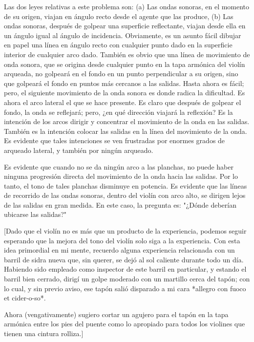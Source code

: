 \documentclass[12pt]{book}
\begin{document}
Las dos leyes relativas a este problema son: (a) Las ondas sonoras, en el momento de su origen, viajan en ángulo recto desde el agente que las produce, (b) Las ondas sonoras, después de golpear una superficie reflectante, viajan desde ella en un ángulo igual al ángulo de incidencia. Obviamente, es un asunto fácil dibujar en papel una línea en ángulo recto con cualquier punto dado en la superficie interior de cualquier arco dado. También es obvio que una línea de movimiento de onda sonora, que se origina desde cualquier punto en la tapa armónica del violín arqueada, no golpeará en el fondo en un punto perpendicular a su origen, sino que golpeará el fondo en puntos más cercanos a las salidas. Hasta ahora es fácil; pero, el siguiente movimiento de la onda sonora es donde radica la dificultad. Es ahora el arco lateral el que se hace presente. Es claro que después de golpear el fondo, la onda se reflejará; pero, ¿en qué dirección viajará la reflexión? Es la intención de los arcos dirigir y concentrar el movimiento de la onda en las salidas. También es la intención colocar las salidas en la línea del movimiento de la onda. Es evidente que tales intenciones se ven frustradas por enormes grados de arqueado lateral, y también por ningún arqueado.

Es evidente que cuando no se da ningún arco a las planchas, no puede haber ninguna progresión directa del movimiento de la onda hacia las salidas. Por lo tanto, el tono de tales planchas disminuye en potencia. Es evidente que las líneas de recorrido de las ondas sonoras, dentro del violín con arco alto, se dirigen lejos de las salidas en gran medida. En este caso, la pregunta es: "¿Dónde deberían ubicarse las salidas?"

[Dado que el violín no es más que un producto de la experiencia, podemos seguir esperando que la mejora del tono del violín solo siga a la experiencia. Con esta idea primordial en mi mente, recuerdo alguna experiencia relacionada con un barril de sidra nueva que, sin querer, se dejó al sol caliente durante todo un día. Habiendo sido empleado como inspector de este barril en particular, y estando el barril bien cerrado, dirigí un golpe moderado con un martillo cerca del tapón; con lo cual, y sin previo aviso, ese tapón salió disparado a mi cara *allegro con fuoco et cider-o-so*.

Ahora (vengativamente) sugiero cortar un agujero para el tapón en la tapa armónica entre los pies del puente como lo apropiado para todos los violines que tienen una cintura rolliza.]
\end{document}
